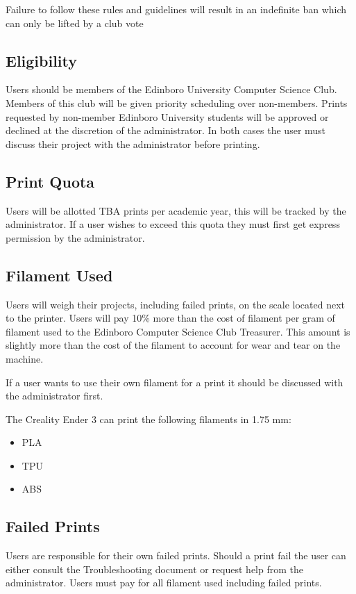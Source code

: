 \documentclass{article}
\begin{document}
Failure to follow these rules and guidelines will result in an indefinite ban which can only be lifted by a club vote

\subsection{Eligibility}

Users should be members of the Edinboro University Computer Science Club. Members of this club will be given priority scheduling over non-members. Prints requested by non-member Edinboro University students will be approved or declined at the discretion of the administrator. In both cases the user must discuss their project with the administrator before printing.

\subsection{Print Quota}

Users will be allotted TBA prints per academic year, this will be tracked by the administrator. If a user wishes to exceed this quota they must first get express permission by the administrator.

\subsection{Filament Used}

Users will weigh their projects, including failed prints, on the scale located next to the printer. Users will pay 10\% more than the cost of filament per gram of filament used to the Edinboro Computer Science Club Treasurer. This amount is slightly more than the cost of the filament to account for wear and tear on the machine.

If a user wants to use their own filament for a print it should be discussed with the administrator first.

The Creality Ender 3 can print the following filaments in 1.75 mm:

\begin{itemize}
	\item PLA
	\item TPU
	\item ABS
\end{itemize}

\subsection{Failed Prints}

Users are responsible for their own failed prints. Should a print fail the user can either consult the Troubleshooting document or request help from the
administrator. Users must pay for all filament used including failed prints.
\end{document}

